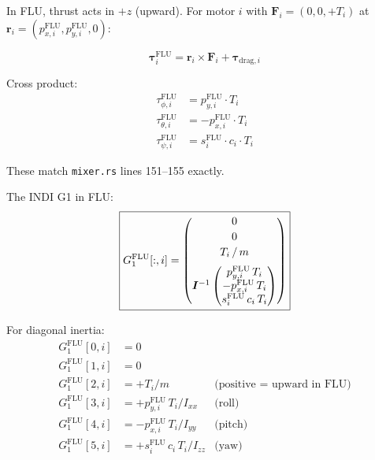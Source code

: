 \documentclass[11pt]{article}
\newcommand{\flu}{\mathrm{FLU}}
\begin{document}
In FLU, thrust acts in $+z$ (upward). For motor $i$ with
$\bm{F}_i = (0, 0, +T_i)$ at $\bm{r}_i = (p_{x,i}^{\flu}, p_{y,i}^{\flu}, 0)$:

\begin{equation}
    \bm{\tau}_i^{\flu} = \bm{r}_i \times \bm{F}_i + \bm{\tau}_{\mathrm{drag},i}
\end{equation}

Cross product:
\begin{align}
    \tau_{\phi,i}^{\flu}   &= p_{y,i}^{\flu} \cdot T_i \label{eq:tau_roll_flu} \\
    \tau_{\theta,i}^{\flu} &= -p_{x,i}^{\flu} \cdot T_i \label{eq:tau_pitch_flu} \\
    \tau_{\psi,i}^{\flu}   &= s_i^{\flu} \cdot c_i \cdot T_i \label{eq:tau_yaw_flu}
\end{align}

These match \texttt{mixer.rs} lines 151--155 exactly.

The INDI G1 in FLU:
\begin{equation}\label{eq:g1_flu}
    \boxed{
    G_1^{\flu}[:,i] = \begin{pmatrix}
        0 \\[2pt]
        0 \\[2pt]
        T_i \,/\, m \\[6pt]
        \multicolumn{1}{c}{\bm{I}^{-1} \begin{pmatrix}
            p_{y,i}^{\flu} \, T_i \\
            -p_{x,i}^{\flu} \, T_i \\
            s_i^{\flu} \, c_i \, T_i
        \end{pmatrix}}
    \end{pmatrix}
    }
\end{equation}

For diagonal inertia:
\begin{align}
    G_1^{\flu}[0,i] &= 0 \\
    G_1^{\flu}[1,i] &= 0 \\
    G_1^{\flu}[2,i] &= +T_i / m & \text{(positive = upward in FLU)} \label{eq:g1_fz_flu} \\
    G_1^{\flu}[3,i] &= +p_{y,i}^{\flu} \, T_i / I_{xx} & \text{(roll)} \\
    G_1^{\flu}[4,i] &= -p_{x,i}^{\flu} \, T_i / I_{yy} & \text{(pitch)} \\
    G_1^{\flu}[5,i] &= +s_i^{\flu} \, c_i \, T_i / I_{zz} & \text{(yaw)}
\end{align}
\end{document}
